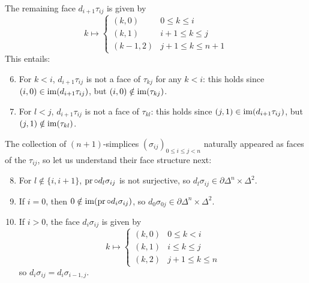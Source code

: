         The remaining face $d_{i+1} \tau_{i j}$ is given by
        \begin{equation*}
            k \mapsto
            \begin{cases}
                (k, 0) & 0 \leq k \leq i \\
                (k, 1) & i + 1 \leq k \leq j \\
                (k - 1, 2) & j + 1 \leq k \leq n + 1
            \end{cases}
        \end{equation*}
        This entails:
        \begin{enumerate}[label=\arabic*)]
            \setcounter{enumi}{5}
            \item 
                For $k < i$, $d_{i+1} \tau_{i j}$ is not a face of $\tau_{k j}$ for any $k < i$: this holds since $(i, 0) \in \operatorname{im}(d_{i+1} \tau_{ij})$, but $(i, 0) \notin \operatorname{im}(\tau_{k j})$.\label{chVI-2-2-6}
            \item 
                For $l < j$, $d_{i+1} \tau_{i j}$ is not a face of $\tau_{k l}$: this holds since $(j, 1) \in \operatorname{im}(d_{i+1} \tau_{i j})$, but $(j, 1) \notin \operatorname{im}(\tau_{k l})$.\label{chVI-2-2-7}
        \end{enumerate}
        The collection of $(n+1)$-simplices $(\sigma_{i j})_{0 \leq i \leq j < n}$ naturally appeared as faces of the $\tau_{i j}$, so let us understand their face structure next:
        \begin{enumerate}[label=\arabic*)]
            \setcounter{enumi}{7}  
            \item 
                For $l \notin \{ i, i + 1 \}$, $\operatorname{pr} \circ d_l \sigma_{i j}$ is not surjective, so $d_l \sigma_{i j} \in \partial \Delta^n \times \Delta^2$.\label{chVI-2-2-8}
            \item 
                If $i = 0$, then $0 \notin \operatorname{im}(\operatorname{pr} \circ d_i \sigma_{i j})$, so $d_0 \sigma_{0 j} \in \partial \Delta^n \times \Delta^2$.\label{chVI-2-2-9}
            \item 
                If $i > 0$, the face $d_i \sigma_{i j}$ is given by
                \begin{equation*}
                    k \mapsto
                    \begin{cases}
                        (k, 0) & 0 \leq k < i \\
                        (k, 1) & i \leq k \leq j \\
                        (k, 2) & j + 1 \leq k \leq n
                    \end{cases}
                \end{equation*}
                so $d_i \sigma_{i j} = d_i \sigma_{i-1, j}$.\label{chVI-2-2-10}  
        \end{enumerate}
